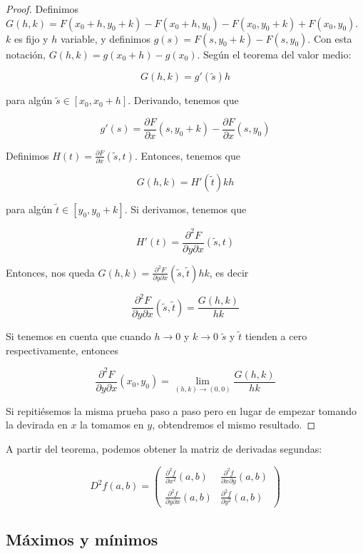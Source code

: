 \documentclass[12pt,a4paper,titlepage]{apuntes}
\begin{document}
\begin{proof}
Definimos $G(h,k) = F(x_0+h, y_0+k) - F(x_0+h, y_0) - F(x_0, y_0 +k) + F(x_0, y_0)$. $k$ es fijo y $h$ variable, y definimos $g(s) = F(s, y_0 + k) - F(s, y_0)$. Con esta notación, $G(h,k) = g(x_0+h) - g(x_0)$. Según el teorema del valor medio:

\[ G(h,k) = g'(\tilde{s})h \]

para algún $\tilde{s} \in [x_0, x_0+h]$. Derivando, tenemos que

\[ g'(s) = \frac{∂F}{∂x}(s, y_0+k) - \frac{∂F}{∂x} (s, y_0) \]

Definimos $H(t) = \frac{∂F}{∂x} (\tilde{s}, t)$. Entonces, tenemos que 

\[G(h,k) = H'(\tilde{t})kh \]

para algún  $\tilde{t} \in [y_0, y_0+k]$. Si derivamos, tenemos que 

\[ H'(t) = \frac{∂^2 F}{∂y∂x}(\tilde{s}, t) \]

Entonces, nos queda $G(h,k) = \frac{∂^2F}{∂y∂x}(\tilde{s}, \tilde{t}) h k$, es decir

\[\frac{∂^2F}{∂y∂x}(\tilde{s}, \tilde{t}) = \frac{G(h,k)}{hk} \]

Si tenemos en cuenta que cuando $h\to 0$ y $k\to 0$ $\tilde{s}$ y $\tilde{t}$ tienden a cero respectivamente, entonces

\[ \frac{∂^2F}{∂y∂x}(x_0, y_0) = \lim_{(h,k) \to (0,0)} \frac{G(h,k)}{hk} \] 

Si repitiésemos la misma prueba paso a paso pero en lugar de empezar tomando la devirada en $x$ la tomamos en $y$, obtendremos el mismo resultado.
\end{proof}

A partir del teorema, podemos obtener la matriz de derivadas segundas:

\begin{defn}
\[D^2f(a,b) = \left(\begin{matrix} \frac{\partial^2 f}{∂ x^2} (a,b) & \frac{\partial^2 f}{\partial x \partial y} (a,b) 
\\ \frac{\partial^2 f}{\partial y \partial x} (a,b) & \frac{\partial^2 f}{\partial y^2} (a,b) \end{matrix}\right) \]
\end{defn}

\subsection{Máximos y mínimos}
\end{document}
